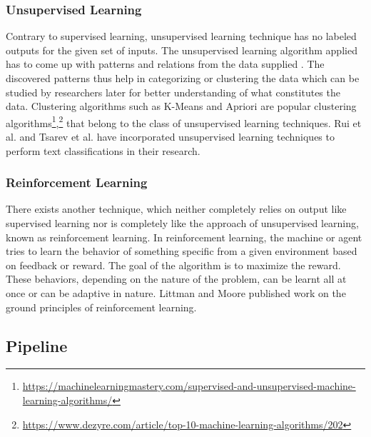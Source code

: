\documentclass[a4paper,12pt,twoside]{report}
\begin{document}
\subsubsection{Unsupervised Learning}  
Contrary to supervised learning, unsupervised learning technique has no labeled outputs for the given set of inputs. The unsupervised learning algorithm applied has to come up with patterns and relations from the data supplied \cite{Ball2011}\cite{Rojas1996}. The discovered patterns thus help in categorizing or clustering the data which can be studied by researchers later for better understanding of what constitutes the data. Clustering algorithms such as K-Means and Apriori are popular clustering algorithms\footnote{\url{https://machinelearningmastery.com/supervised-and-unsupervised-machine-learning-algorithms/}},\footnote{\url{https://www.dezyre.com/article/top-10-machine-learning-algorithms/202}} that belong to the class of unsupervised learning techniques. Rui et al.\cite{Rui2016} and Tsarev et al. \cite{Tsarev2011} have incorporated unsupervised learning techniques to perform text classifications in their research. 

\subsubsection{Reinforcement Learning} 
There exists another technique, which neither completely relies on output like supervised learning nor is completely like the approach of unsupervised learning, known as reinforcement learning. In reinforcement learning, the machine or agent tries to learn the behavior of something specific from a given environment based on feedback or reward. The goal of the algorithm is to maximize the reward. These behaviors, depending on the nature of the problem, can be learnt all at once or can be adaptive in nature. Littman and Moore \cite{Littman1996} published work on the ground principles of reinforcement learning. 

\subsection{Pipeline}
\end{document}
